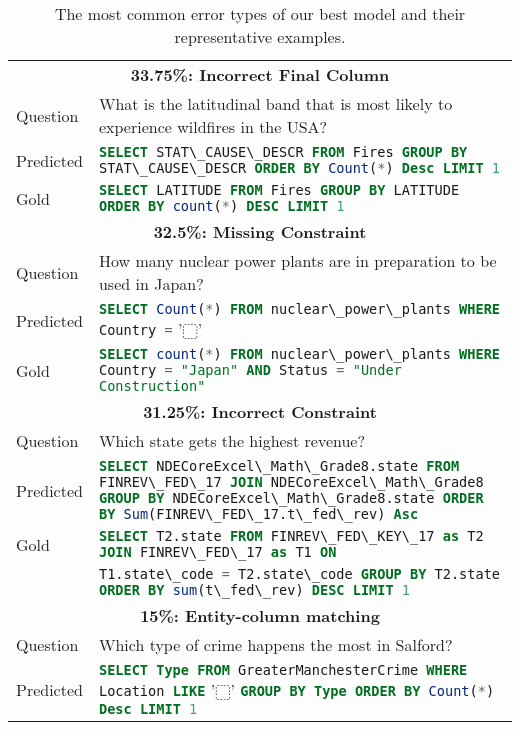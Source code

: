 \documentclass[11pt,a4paper]{article}
\newcommand{\sql}[1]{\lstinline[language=SQL, basicstyle=\footnotesize\ttfamily]{#1}}
\begin{document}
\begin{table*}[t]
    \small
    \centering
    \caption{The most common error types of our best model and their representative examples.}
    \label{tab:error_example}
\begin{tabular}{lp{14.2cm}}
        \toprule
        \multicolumn{2}{c}{\bfseries 33.75\%:  Incorrect Final Column} \\
        Question  &  What is the latitudinal band that is most likely to experience wildfires in the USA?\\
        Predicted &  \sql{SELECT STAT\_CAUSE\_DESCR FROM Fires GROUP BY STAT\_CAUSE\_DESCR ORDER BY Count(*) Desc LIMIT 1}\\
        Gold & \sql{SELECT LATITUDE FROM Fires GROUP BY LATITUDE ORDER BY count(*) DESC LIMIT 1} \\
        \midrule
        \multicolumn{2}{c}{\bfseries 32.5\%:  Missing Constraint} \\
        Question  &  How many nuclear power plants are in preparation to be used in Japan? \\
        Predicted & \sql{SELECT Count(*) FROM nuclear\_power\_plants WHERE Country =} '$\dottedsquare$' \\
        Gold & \sql{SELECT count(*) FROM nuclear\_power\_plants WHERE Country = "Japan" AND Status = "Under Construction"} \\
        \midrule
        \multicolumn{2}{c}{\bfseries 31.25\%:  Incorrect Constraint} \\
        Question  &  Which state gets the highest revenue?\\
        Predicted &  \sql{SELECT NDECoreExcel\_Math\_Grade8.state FROM FINREV\_FED\_17 JOIN NDECoreExcel\_Math\_Grade8 GROUP BY NDECoreExcel\_Math\_Grade8.state ORDER BY Sum(FINREV\_FED\_17.t\_fed\_rev) Asc}\\
        Gold &   \sql{SELECT T2.state FROM FINREV\_FED\_KEY\_17 as T2 JOIN FINREV\_FED\_17 as T1 ON} \\ & \sql{T1.state\_code = T2.state\_code GROUP BY T2.state ORDER BY sum(t\_fed\_rev) DESC LIMIT 1}\\
        \midrule
        \multicolumn{2}{c}{\bfseries 15\%:  Entity-column matching} \\
        Question  & Which type of crime happens the most in Salford? \\
        Predicted &  \sql{SELECT Type FROM GreaterManchesterCrime WHERE Location LIKE} '$\dottedsquare$' \sql{GROUP BY Type ORDER BY Count(*) Desc LIMIT 1}\\

\end{tabular}
\end{table*}
\end{document}
